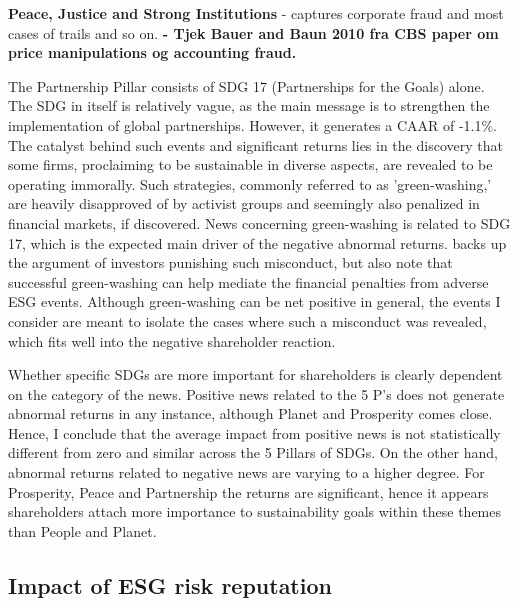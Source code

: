 \textbf{Peace, Justice and Strong Institutions} - captures corporate fraud and most cases of trails and so
on.
\textbf{- Tjek Bauer and Baun 2010 fra CBS paper om price manipulations og accounting fraud. }

The Partnership Pillar consists of SDG 17 (Partnerships for the Goals) alone. The SDG in itself is relatively vague, as the main message is to strengthen the implementation of global partnerships. However, it generates a CAAR of -1.1\%. The catalyst behind such events and significant returns lies in the discovery that some firms, proclaiming to be sustainable in diverse aspects, are revealed to be operating immorally. Such strategies, commonly referred to as 'green-washing,' are heavily disapproved of by activist groups and seemingly also penalized in financial markets, if discovered. News concerning green-washing is related to SDG 17, which is the expected main driver of the negative abnormal returns. \cite{Blancard_ESG_sentiment} backs up the argument of investors punishing such misconduct, but also note that successful green-washing can help mediate the financial penalties from adverse ESG events. Although green-washing can be net positive in general, the events I consider are meant to isolate the cases where such a misconduct was revealed, which fits well into the negative shareholder reaction.   

Whether specific SDGs are more important for shareholders is clearly dependent on the category of the news. Positive news related to the 5 P's does not generate abnormal returns in any instance, although Planet and Prosperity comes close. Hence, I conclude that the average impact from positive news is not statistically different from zero and similar across the 5 Pillars of SDGs. On the other hand, abnormal returns related to negative news are varying to a higher degree. For Prosperity, Peace and Partnership the returns are significant, hence it appears shareholders attach more importance to sustainability goals within these themes than People and Planet.    



\subsection{Impact of ESG risk reputation}

